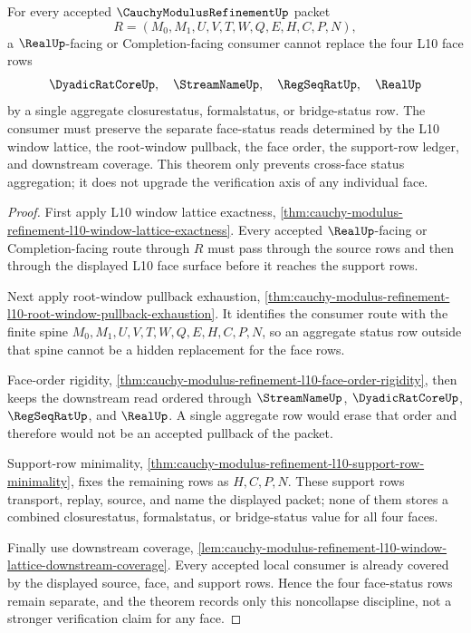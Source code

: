 \begin{theorem}
\label{thm:cauchy-modulus-refinement-l10-face-status-noncollapse}
For every accepted $\CauchyModulusRefinementUp$ packet
$$
R=(M_0,M_1,U,V,T,W,Q,E,H,C,P,N),
$$
a $\RealUp$-facing or Completion-facing consumer cannot replace the four L10
face rows
$$
\DyadicRatCoreUp,\quad \StreamNameUp,\quad \RegSeqRatUp,\quad \RealUp
$$
by a single aggregate closurestatus, formalstatus, or bridge-status row. The
consumer must preserve the separate face-status reads determined by the L10
window lattice, the root-window pullback, the face order, the support-row
ledger, and downstream coverage. This theorem only prevents cross-face status
aggregation; it does not upgrade the verification axis of any individual
face.
\end{theorem}
\begin{proof}
First apply L10 window lattice exactness,
\autoref{thm:cauchy-modulus-refinement-l10-window-lattice-exactness}. Every
accepted $\RealUp$-facing or Completion-facing route through $R$ must pass
through the source rows and then through the displayed L10 face surface before
it reaches the support rows.

Next apply root-window pullback exhaustion,
\autoref{thm:cauchy-modulus-refinement-l10-root-window-pullback-exhaustion}.
It identifies the consumer route with the finite spine
$M_0,M_1,U,V,T,W,Q,E,H,C,P,N$, so an aggregate status row outside that spine
cannot be a hidden replacement for the face rows.

Face-order rigidity,
\autoref{thm:cauchy-modulus-refinement-l10-face-order-rigidity}, then keeps
the downstream read ordered through $\StreamNameUp$, $\DyadicRatCoreUp$,
$\RegSeqRatUp$, and $\RealUp$. A single aggregate row would erase that order
and therefore would not be an accepted pullback of the packet.

Support-row minimality,
\autoref{thm:cauchy-modulus-refinement-l10-support-row-minimality}, fixes the
remaining rows as $H,C,P,N$. These support rows transport, replay, source, and
name the displayed packet; none of them stores a combined closurestatus,
formalstatus, or bridge-status value for all four faces.

Finally use downstream coverage,
\autoref{lem:cauchy-modulus-refinement-l10-window-lattice-downstream-coverage}.
Every accepted local consumer is already covered by the displayed source,
face, and support rows. Hence the four face-status rows remain separate, and
the theorem records only this noncollapse discipline, not a stronger
verification claim for any face.
\end{proof}

